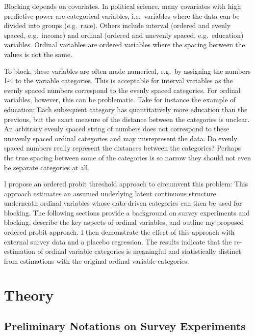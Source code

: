 \documentclass[12pt,econ]{sources/authesis}
\begin{document}
Blocking depends on covariates. In political science, many covariates with high predictive power are categorical variables, i.e.~variables where the data can be divided into groups (e.g.~race). Others include interval (ordered and evenly spaced, e.g.~income) and ordinal (ordered and unevenly spaced, e.g.~education) variables. Ordinal variables are ordered variables where the spacing between the values is not the same.

To block, these variables are often made numerical, e.g.~by assigning the numbers 1-4 to the variable categories. This is acceptable for interval variables as the evenly spaced numbers correspond to the evenly spaced categories. For ordinal variables, however, this can be problematic. Take for instance the example of education: Each subsequent category has quantitatively more education than the previous, but the exact measure of the distance between the categories is unclear. An arbitrary evenly spaced string of numbers does not correspond to these unevenly spaced ordinal categories and may misrepresent the data. Do evenly spaced numbers really represent the distances between the categories? Perhaps the true spacing between some of the categories is so narrow they should not even be separate categories at all.

I propose an ordered probit threshold approach to circumvent this problem: This approach estimates an assumed underlying latent continuous structure underneath ordinal variables whose data-driven categories can then be used for blocking. The following sections provide a background on survey experiments and blocking, describe the key aspects of ordinal variables, and outline my proposed ordered probit approach. I then demonstrate the effect of this approach with external survey data and a placebo regression. The results indicate that the re-estimation of ordinal variable categories is meaningful and statistically distinct from estimations with the original ordinal variable categories.

\hypertarget{ordblock-theory}{%
\section{Theory}\label{ordblock-theory}}

\hypertarget{ordblock-theory-experiments}{%
\subsection{Preliminary Notations on Survey Experiments}\label{ordblock-theory-experiments}}
\end{document}
